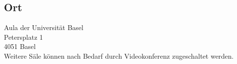 \subsection*{Ort}
Aula der Universit\"at Basel\\
Petersplatz 1\\
4051 Basel\\
\newline
Weitere S\"ale k\"onnen nach Bedarf durch Videokonferenz zugeschaltet werden.
